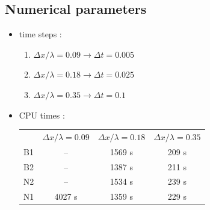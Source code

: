 \subsection{Numerical parameters}
\begin{itemize}
\item time steps :
	\begin{enumerate}
    \item $\Delta x / \lambda = 0.09  \rightarrow \Delta t = 0.005 $
    \item $\Delta x / \lambda = 0.18  \rightarrow \Delta t = 0.025 $
    \item $\Delta x / \lambda = 0.35  \rightarrow \Delta t = 0.1 $
  \end{enumerate}
\item CPU times : \\
\begin{tabular}{cccc}
 & $\Delta x / \lambda = 0.09 $ &$\Delta x / \lambda = 0.18 $&$\Delta x / \lambda = 0.35 $\\
 B1 & -- & 1569 s & 209 s \\
 B2 & -- & 1387 s & 211 s \\
 N2 & -- & 1534 s & 239 s \\
 N1 & 4027 s & 1359 s & 229 s\\

\end{tabular}
\end{itemize}

